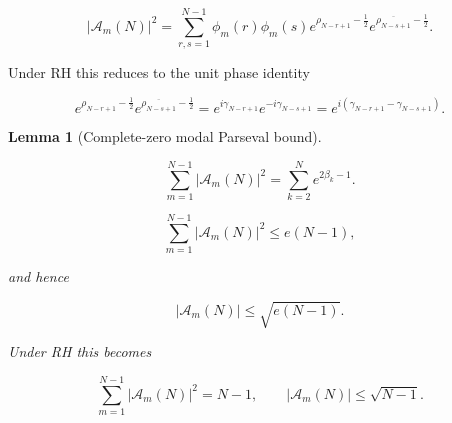 \documentclass[11pt]{amsart}
\numberwithin{equation}{section}
\theoremstyle{plain}
\newtheorem{lemma}[theorem]{Lemma}
\theoremstyle{definition}
\theoremstyle{remark}
\begin{document}
\begin{equation}
|\mathcal A_m(N)|^2
=
\sum_{r,s=1}^{N-1}
\phi_m(r)\phi_m(s)
e^{\rho_{N-r+1}-\frac12}
e^{\overline{\rho_{N-s+1}}-\frac12}.
\label{eq:complete_zero_modal_energy_expansion}
\end{equation}

Under RH this reduces to the unit phase identity

\begin{equation}
e^{\rho_{N-r+1}-\frac12}
e^{\overline{\rho_{N-s+1}}-\frac12}
=
e^{i\gamma_{N-r+1}}e^{-i\gamma_{N-s+1}}
=
e^{i(\gamma_{N-r+1}-\gamma_{N-s+1})}.
\label{eq:complete_zero_modal_energy_RH_reduction}
\end{equation}

\begin{lemma}[Complete-zero modal Parseval bound]
\label{lem:complete_zero_modal_parseval_bound}

\begin{equation}
\sum_{m=1}^{N-1}|\mathcal A_m(N)|^2
=
\sum_{k=2}^{N}e^{2\beta_k-1}.
\label{eq:complete_zero_modal_parseval_identity}
\end{equation}

\begin{equation}
\sum_{m=1}^{N-1}|\mathcal A_m(N)|^2
\le
e(N-1),
\label{eq:complete_zero_modal_parseval_bound}
\end{equation}

and hence

\begin{equation}
|\mathcal A_m(N)|
\le
\sqrt{e(N-1)}.
\label{eq:complete_zero_modal_bound}
\end{equation}

Under RH this becomes

\begin{equation}
\sum_{m=1}^{N-1}|\mathcal A_m(N)|^2=N-1,
\qquad
|\mathcal A_m(N)|
\le
\sqrt{N-1}.
\label{eq:complete_zero_modal_bound_RH}
\end{equation}

\end{lemma}
\end{document}
